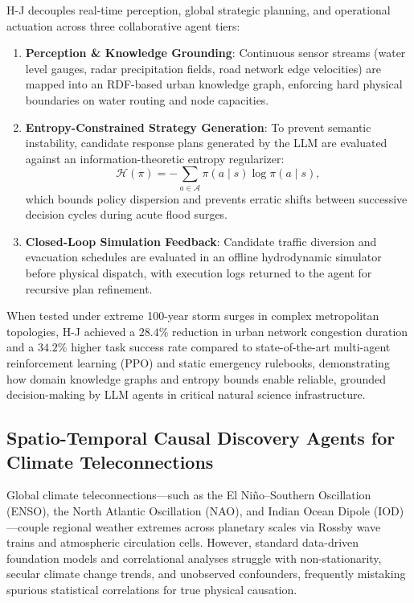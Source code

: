 H-J decouples real-time perception, global strategic planning, and operational actuation across three collaborative agent tiers:
\begin{enumerate}
    \item \textbf{Perception \& Knowledge Grounding}: Continuous sensor streams (water level gauges, radar precipitation fields, road network edge velocities) are mapped into an RDF-based urban knowledge graph, enforcing hard physical boundaries on water routing and node capacities.
    \item \textbf{Entropy-Constrained Strategy Generation}: To prevent semantic instability, candidate response plans generated by the LLM are evaluated against an information-theoretic entropy regularizer:
    \begin{equation}
        \mathcal{H}(\pi) = -\sum_{a \in \mathcal{A}} \pi(a \mid s) \log \pi(a \mid s),
    \end{equation}
    which bounds policy dispersion and prevents erratic shifts between successive decision cycles during acute flood surges.
    \item \textbf{Closed-Loop Simulation Feedback}: Candidate traffic diversion and evacuation schedules are evaluated in an offline hydrodynamic simulator before physical dispatch, with execution logs returned to the agent for recursive plan refinement.
\end{enumerate}
When tested under extreme 100-year storm surges in complex metropolitan topologies, H-J achieved a $28.4\%$ reduction in urban network congestion duration and a $34.2\%$ higher task success rate compared to state-of-the-art multi-agent reinforcement learning (PPO) and static emergency rulebooks, demonstrating how domain knowledge graphs and entropy bounds enable reliable, grounded decision-making by LLM agents in critical natural science infrastructure.

\subsection{Spatio-Temporal Causal Discovery Agents for Climate Teleconnections}
\label{sec:causal_discovery_agents}

Global climate teleconnections---such as the El Ni\~no--Southern Oscillation (ENSO), the North Atlantic Oscillation (NAO), and Indian Ocean Dipole (IOD)---couple regional weather extremes across planetary scales via Rossby wave trains and atmospheric circulation cells. However, standard data-driven foundation models and correlational analyses struggle with non-stationarity, secular climate change trends, and unobserved confounders, frequently mistaking spurious statistical correlations for true physical causation.

